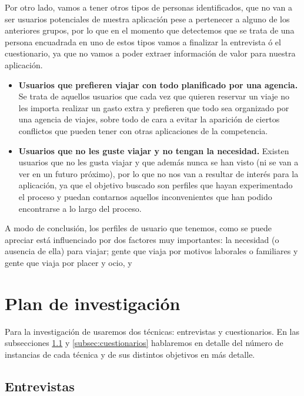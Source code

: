 Por otro lado, vamos a tener otros tipos de personas identificados, que no van a ser usuarios potenciales de nuestra aplicación pese a pertenecer a 
alguno de los anteriores grupos, por lo que en el momento que detectemos que se trata de una persona encuadrada en uno de estos tipos
vamos a finalizar la entrevista ó el cuestionario, ya que no vamos a poder extraer información de valor para nuestra aplicación.


\begin{itemize}
    \item {\textbf{Usuarios que prefieren viajar con todo planificado por una agencia.}} Se trata de aquellos usuarios que cada vez que quieren
        reservar un viaje no les importa realizar un gasto extra y prefieren que todo sea organizado por una agencia de viajes, sobre todo de cara a
        evitar la aparición de ciertos conflictos que pueden tener con otras aplicaciones de la competencia.
    \item {\textbf{Usuarios que no les guste viajar y no tengan la necesidad.}} Existen usuarios que no les gusta viajar y que además nunca se han visto
        (ni se van a ver en un futuro próximo), por lo que no nos van a resultar de interés para la aplicación, ya que el objetivo buscado son perfiles que
        hayan experimentado el proceso y puedan contarnos aquellos inconvenientes que han podido encontrarse a lo largo del proceso.
\end{itemize}
 
A modo de conclusión, los perfiles de usuario que tenemos, como se puede apreciar está influenciado por dos factores muy importantes: la necesidad (o ausencia de ella) para viajar; gente que viaja por motivos laborales o familiares y gente que viaja por placer y ocio, y

\section{Plan de investigación}

Para la investigación de \textit{\app} usaremos dos técnicas: entrevistas y cuestionarios. En las subsecciones \ref{subsec:entrevistas} y \ref{subsec:cuestionarios} hablaremos en detalle del número de instancias de cada técnica y de sus distintos objetivos en más detalle.

\subsection{Entrevistas} \label{subsec:entrevistas}

